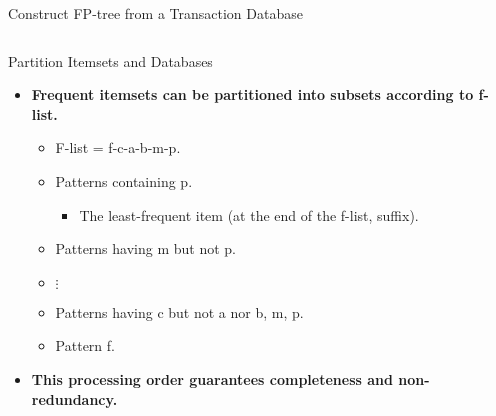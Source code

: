 \begin{frame}{Construct FP-tree from a Transaction Database}
\begin{columns}
\begin{column}{0.5\textwidth}
{
			}
		\end{column}
	\end{columns}
\end{frame}

\begin{frame}{Partition Itemsets and Databases}
	\begin{itemize}
		\item \textbf{Frequent itemsets can be partitioned into subsets 
		according to f-list.}
		\begin{itemize}
			\item F-list = f-c-a-b-m-p.
			\item Patterns containing p.
			\begin{itemize}
				\item The least-frequent item (at the end of the f-list, 
				suffix).
			\end{itemize}
			\item Patterns having m but not p.
			\item $\vdots$
			\item Patterns having c but not a nor b, m, p.
			\item Pattern f.
		\end{itemize}
		\item \textbf{This processing order guarantees completeness and 
		non-redundancy.}
	\end{itemize}
\end{frame}

